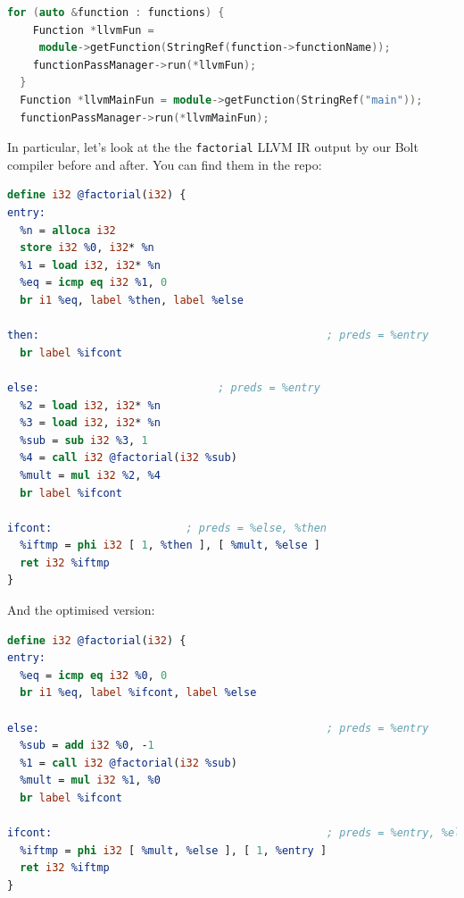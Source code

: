 %

\begin{lstlisting}[language=C++,caption={ir\_codegen\_visitor.cc}]
for (auto &function : functions) {
    Function *llvmFun =
     module->getFunction(StringRef(function->functionName));
    functionPassManager->run(*llvmFun);
  }
  Function *llvmMainFun = module->getFunction(StringRef("main"));
  functionPassManager->run(*llvmMainFun);
\end{lstlisting}

In particular, let's look at the the \texttt{factorial} LLVM IR output
by our Bolt compiler before and after. You can find them in the repo:

%

\begin{lstlisting}[language=llvm,caption={{factorial-unoptimised.ll}}]
define i32 @factorial(i32) {
entry:
  %n = alloca i32
  store i32 %0, i32* %n
  %1 = load i32, i32* %n
  %eq = icmp eq i32 %1, 0
  br i1 %eq, label %then, label %else

then:                                             ; preds = %entry
  br label %ifcont

else:                            ; preds = %entry
  %2 = load i32, i32* %n
  %3 = load i32, i32* %n
  %sub = sub i32 %3, 1
  %4 = call i32 @factorial(i32 %sub)
  %mult = mul i32 %2, %4
  br label %ifcont

ifcont:                     ; preds = %else, %then
  %iftmp = phi i32 [ 1, %then ], [ %mult, %else ]
  ret i32 %iftmp
}
\end{lstlisting}

And the optimised version:

%

\begin{lstlisting}[language=llvm,caption={{factorial-optimised.ll}}]
define i32 @factorial(i32) {
entry:
  %eq = icmp eq i32 %0, 0
  br i1 %eq, label %ifcont, label %else

else:                                             ; preds = %entry
  %sub = add i32 %0, -1
  %1 = call i32 @factorial(i32 %sub)
  %mult = mul i32 %1, %0
  br label %ifcont

ifcont:                                           ; preds = %entry, %else
  %iftmp = phi i32 [ %mult, %else ], [ 1, %entry ]
  ret i32 %iftmp
}
\end{lstlisting}

